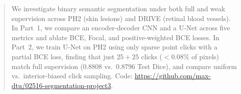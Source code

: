 \begin{abstract}
We investigate binary semantic segmentation under both full and weak supervision across PH2 (skin lesions) and DRIVE (retinal blood vessels). In Part~1, we compare an encoder-decoder CNN and a U-Net across five metrics and ablate BCE, Focal, and positive-weighted BCE losses. In Part~2, we train U-Net on PH2 using only sparse point clicks with a partial BCE loss, finding that just $25+25$ clicks ($<0.08\%$ of pixels) match full supervision ($0.8808$ vs.\ $0.8796$ Test Dice), and compare uniform vs.\ interior-biased click sampling. Code: \url{https://github.com/max-dtu/02516-segmentation-project3}.
\end{abstract}
